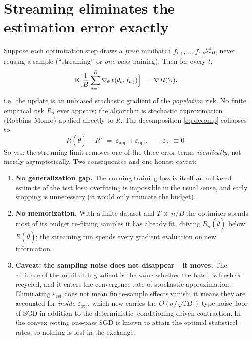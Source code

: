 \documentclass[11pt]{article}
\newcommand{\eps}{\varepsilon}
\newcommand{\E}{\mathbb{E}}
\begin{document}
\section{Streaming eliminates the estimation error exactly}

Suppose each optimization step draws a \emph{fresh} minibatch
$f_{t,1},\dots,f_{t,B}\overset{\text{iid}}{\sim}\mu$, never reusing a sample
(``streaming'' or \emph{one-pass} training). Then for every $t$,
\begin{equation}
  \E\Bigl[\frac1B\sum_{j=1}^B \nabla_\theta\,\ell(\theta_t; f_{t,j})\Bigr]
  \;=\; \nabla R(\theta_t),
\end{equation}
i.e.\ the update is an unbiased stochastic gradient of the \emph{population} risk. No
finite empirical risk $R_n$ ever appears; the algorithm is stochastic approximation
(Robbins--Monro) applied directly to $R$. The decomposition \eqref{eq:decomp} collapses to
\begin{equation}
  R(\tilde\theta)-R^\star \;=\; \eps_{\mathrm{app}} + \eps_{\mathrm{opt}},
  \qquad \eps_{\mathrm{est}} \equiv 0 .
\end{equation}
So yes: the streaming limit removes one of the three error terms \emph{identically}, not
merely asymptotically. Two consequences and one honest caveat:

\begin{enumerate}
  \item \textbf{No generalization gap.} The running training loss is itself an unbiased
  estimate of the test loss; overfitting is impossible in the usual sense, and early
  stopping is unnecessary (it would only truncate the budget).
  \item \textbf{No memorization.} With a finite dataset and $T\gg n/B$ the optimizer
  spends most of its budget re-fitting samples it has already fit, driving
  $R_n(\tilde\theta)$ below $R(\tilde\theta)$; the streaming run spends every gradient
  evaluation on new information.
  \item \textbf{Caveat: the sampling noise does not disappear---it moves.} The variance
  of the minibatch gradient is the same whether the batch is fresh or recycled, and it
  enters the convergence rate of stochastic approximation. Eliminating
  $\eps_{\mathrm{est}}$ does not mean finite-sample effects vanish; it means they are
  accounted for \emph{inside} $\eps_{\mathrm{opt}}$, which now carries the
  $O(\sigma/\sqrt{TB})$-type noise floor of SGD in addition to the deterministic,
  conditioning-driven contraction. In the convex setting one-pass SGD is known to attain
  the optimal statistical rates, so nothing is lost in the exchange.
\end{enumerate}
\end{document}
